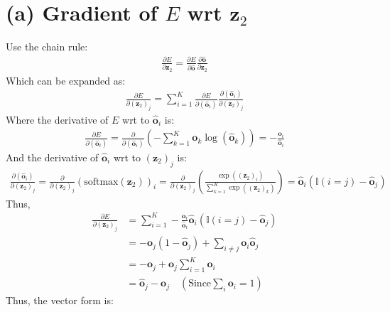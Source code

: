 \documentclass[11pt, a4paper, oneside]{memoir}
\begin{document}
\section*{(a) Gradient of $E$ wrt $\boldsymbol{z}_2$}
Use the chain rule:
\begin{align*}
    \frac{\partial E}{\partial \boldsymbol{z}_2} = \frac{\partial E}{\partial \hat{\boldsymbol{o}}} \frac{\partial \hat{\boldsymbol{o}}}{\partial \boldsymbol{z}_2}
\end{align*}
Which can be expanded as:
\begin{align*}
    \frac{\partial E}{\partial (\boldsymbol{z}_2)_j} = \sum_{i=1}^{K} \frac{\partial E}{\partial (\hat{\boldsymbol{o}}_i)} \frac{\partial (\hat{\boldsymbol{o}}_i)}{\partial (\boldsymbol{z}_2)_j}
\end{align*}
Where the derivative of $E$ wrt to $\hat{\boldsymbol{o}}_i$ is:
\begin{align*}
    \frac{\partial E}{\partial (\hat{\boldsymbol{o}}_i)} = \frac{\partial}{\partial (\hat{\boldsymbol{o}}_i)} \left( -\sum_{k=1}^{K} \boldsymbol{o}_k \log(\hat{\boldsymbol{o}}_k) \right) = -\frac{\boldsymbol{o}_i}{\hat{\boldsymbol{o}}_i}
\end{align*}
And the derivative of $\hat{\boldsymbol{o}}_i$ wrt to $(\boldsymbol{z}_2)_j$ is:
\begin{align*}
    \frac{\partial (\hat{\boldsymbol{o}}_i)}{\partial (\boldsymbol{z}_2)_j} = \frac{\partial}{\partial (\boldsymbol{z}_2)_j} \left( \text{softmax}(\boldsymbol{z}_2) \right)_i = \frac{\partial}{\partial (\boldsymbol{z}_2)_j} \left( \frac{\exp((\boldsymbol{z}_2)_i)}{\sum_{k=1}^{K} \exp((\boldsymbol{z}_2)_k)} \right) = \hat{\boldsymbol{o}}_i(\mathbb{I}(i=j) - \hat{\boldsymbol{o}}_j)
\end{align*}
Thus,
\begin{align*}
    \frac{\partial E}{\partial (\boldsymbol{z}_2)_j} &= \sum_{i=1}^{K} -\frac{\boldsymbol{o}_i}{\hat{\boldsymbol{o}}_i} \hat{\boldsymbol{o}}_i(\mathbb{I}(i=j) - \hat{\boldsymbol{o}}_j) \\
    &= -\boldsymbol{o}_j (1 - \hat{\boldsymbol{o}}_j) + \sum_{i \neq j} \boldsymbol{o}_i \hat{\boldsymbol{o}}_j \\
    &= -\boldsymbol{o}_j + \hat{\boldsymbol{o}}_j \sum_{i=1}^{K} \boldsymbol{o}_i \\
    &= \hat{\boldsymbol{o}}_j - \boldsymbol{o}_j \quad (\text{Since} \sum_i \boldsymbol{o}_i = 1)
\end{align*}
Thus, the vector form is:
\end{document}
